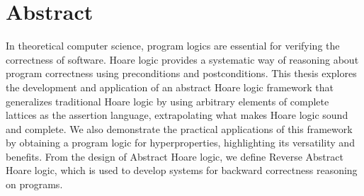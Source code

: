 {}
\begingroup

\chapter*{Abstract}

In theoretical computer science, program logics are essential for verifying the
correctness of software. Hoare logic provides a systematic way of reasoning
about program correctness using preconditions and postconditions. This thesis
explores the development and application of an abstract Hoare logic framework
that generalizes traditional Hoare logic by using arbitrary elements of
complete lattices as the assertion language, extrapolating what makes Hoare
logic sound and complete. We also demonstrate the practical applications of
this framework by obtaining a program logic for hyperproperties, highlighting
its versatility and benefits. From the design of Abstract Hoare logic, we
define Reverse Abstract Hoare logic, which is used to develop systems for
backward correctness reasoning on programs.

\vfill
